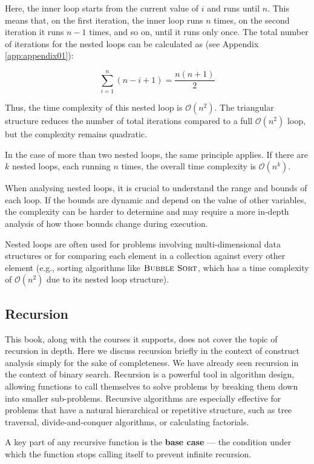 Here, the inner loop starts from the current value of $i$ and runs until $n$. This means that, on the first iteration, the inner loop runs $n$ times, on the second iteration it runs $n-1$ times, and so on, until it runs only once. The total number of iterations for the nested loops can be calculated as (see Appendix \ref{app:appendix01}):

\[
\sum_{i=1}^{n} (n - i + 1) = \frac{n (n + 1)}{2}
\]

Thus, the time complexity of this nested loop is $\mathcal{O}(n^2)$. The triangular structure reduces the number of total iterations compared to a full $\mathcal{O}(n^2)$ loop, but the complexity remains quadratic.

In the case of more than two nested loops, the same principle applies. If there are $k$ nested loops, each running $n$ times, the overall time complexity is $\mathcal{O}(n^k)$.

When analysing nested loops, it is crucial to understand the range and bounds of each loop. If the bounds are dynamic and depend on the value of other variables, the complexity can be harder to determine and may require a more in-depth analysis of how those bounds change during execution.

Nested loops are often used for problems involving multi-dimensional data structures or for comparing each element in a collection against every other element (e.g., sorting algorithms like $\proc{Bubble Sort}$, which has a time complexity of $\mathcal{O}(n^2)$ due to its nested loop structure).

\subsection*{Recursion}
This book, along with the courses it supports, does not cover the topic of recursion in depth. Here we discuss recursion briefly in the context of construct analysis simply for the sake of completeness. We have already seen recursion in the context of binary search. Recursion is a powerful tool in algorithm design, allowing functions to call themselves to solve problems by breaking them down into smaller sub-problems. Recursive algorithms are especially effective for problems that have a natural hierarchical or repetitive structure, such as tree traversal, divide-and-conquer algorithms, or calculating factorials.

A key part of any recursive function is the \textbf{base case} — the condition under which the function stops calling itself to prevent infinite recursion.

